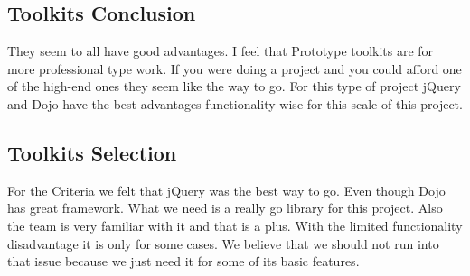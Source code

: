 \documentclass[10pt,draftclsnofoot,onecolumn]{IEEEtran}
\begin{document}
    \subsection{Toolkits Conclusion}
     They seem to all have good advantages.  I feel that Prototype toolkits are for more professional type work.  If you were doing a project and you could afford one of the high-end ones they seem like the way to go.  For this type of project jQuery and Dojo have the best advantages functionality wise for this scale of this project.  
     \subsection{Toolkits Selection}
      For the Criteria we felt that jQuery was the best way to go. Even though Dojo has great framework.  What we need is a really go library for this project.  Also the team is very familiar with it and that is a plus.  With the limited functionality disadvantage it is only for some cases.  We believe that we should not run into that issue because we just need it for some of its basic features.
	\printindex



\end{document}
